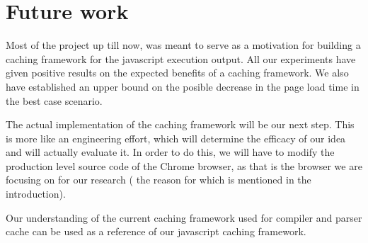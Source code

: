 \section{Future work}
\label{sec:future-work}

Most of the project up till now, was meant to serve as a motivation for building 
a caching framework for the javascript execution output. All our experiments
have given positive results on the expected benefits of a caching framework. 
We also have established an upper bound on the posible decrease in the page load time
in the best case scenario. 

The actual implementation of the caching framework will be our next step. 
This is more like an engineering effort, which will determine the efficacy
of our idea and will actually evaluate it. 
In order to do this, we will have to modify the production level 
source code of the Chrome browser, as that is the browser we
are focusing on for our research ( the reason for which is mentioned
in the introduction). 

Our understanding of the current caching framework used for compiler
and parser cache can be used as a reference of our javascript caching
framework. 

